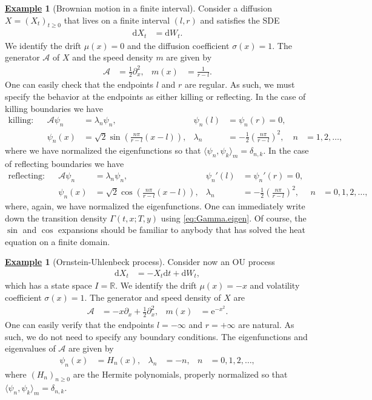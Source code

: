 \documentclass[12pt]{book}
\numberwithin{equation}{chapter}
\theoremstyle{plain}
\numberwithin{theorem}{section}
\theoremstyle{definition}
\newtheorem{example}[theorem]{\underline{Example}}
\numberwithin{exercise}{chapter}
\newcommand{\<}{\langle}
\renewcommand{\>}{\rangle}
\renewcommand{\(}{\left(}
\renewcommand{\)}{\right)}
\renewcommand{\[}{\left[}
\renewcommand{\]}{\right]}
\newcommand\Rb{\mathds{R}}
\newcommand\Ac{\mathscr{A}}
\newcommand\sig{\sigma}
\newcommand\Gam{\Gamma}
\newcommand\lam{\lambda}
\newcommand\del{\delta}
\renewcommand\d{\partial}
\newcommand\dd{\mathrm{d}}
\newcommand\ee{\mathrm{e}}
\begin{document}
\begin{example}[Brownian motion in a finite interval]
Consider a diffusion $X = (X_t)_{t \geq 0}$ that lives on a finite interval $(l,r)$ and satisfies the SDE
\begin{align}
\dd X_t
	&=	\dd W_t .
\end{align}
We identify the drift $\mu(x) = 0$ and the diffusion coefficient $\sig(x) = 1$.  The generator $\Ac$ of $X$ and the speed density $m$ are given by
\begin{align}
\Ac
	&=	\tfrac{1}{2} \d_x^2 , &
m(x)
	&=	\frac{1}{r-l} .
\end{align}
One can easily check that the endpoints $l$ and $r$ are regular.  As such, we must specify the behavior at the endpoints as either killing or reflecting.  In the case of killing boundaries we have
\begin{align}
\text{killing}:&&
\Ac \psi_n
	&=	\lam_n \psi_n , &
\psi_n(l)
	&=	\psi_n(r) = 0 , \\ &&
\psi_n(x)	
	&=	\sqrt{2} \sin \( \frac{n \pi}{r-l}(x-l) \) , &
\lam_n
	&=	- \frac{1}{2} \( \frac{n \pi}{r-l} \)^2 , &
n
	&=	1, 2, \ldots ,
\end{align}
where we have normalized the eigenfunctions so that $\< \psi_n, \psi_k \>_m = \del_{n,k}$.
In the case of reflecting boundaries we have
\begin{align}
\text{reflecting}:&&
\Ac \psi_n
	&=	\lam_n \psi_n , &
\psi_n'(l)
	&=	\psi_n'(r) = 0 , \\ &&
\psi_n(x)	
	&=	\sqrt{2} \cos \( \frac{n \pi}{r-l}(x-l) \) , &
\lam_n
	&=	- \frac{1}{2} \( \frac{n \pi}{r-l} \)^2 , &
n
	&=	0, 1, 2, \ldots ,
\end{align}
where, again, we have normalized the eigenfunctions.
One can immediately write down the transition density $\Gam(t,x;T,y)$ using \eqref{eq:Gamma.eigen}.  Of course, the $\sin$ and $\cos$ expansions should be familiar to anybody that has solved the heat equation on a finite domain.
\end{example}

\begin{example}[Ornstein-Uhlenbeck process]
Consider now an OU process
\begin{align}
\dd X_t
	&=	- X_t \dd t + \dd W_t ,
\end{align}
which has a state space $I = \Rb$.  We identify the drift $\mu(x) = - x$ and volatility coefficient $\sig(x) = 1$.  The generator and speed density of $X$ are
\begin{align}
\Ac
	&=	- x \d_x + \tfrac{1}{2} \d_x^2 , &
m(x)
	&=	\ee^{-x^2} .
\end{align}
One can easily verify that the endpoints $l= -\infty$ and $r = + \infty$ are natural.  As such, we do not need to specify any boundary conditions.  The eigenfunctions and eigenvalues of $\Ac$ are given by
\begin{align}
\psi_n(x)
	&=	H_n(x) , &
\lam_n
	&= - n , &
n
	&=	0, 1, 2, \ldots ,
\end{align}
where $(H_n)_{n \geq 0}$ are the Hermite polynomials, properly normalized so that $\< \psi_n, \psi_k \>_m = \del_{n,k}$.
\end{example}
\end{document}
